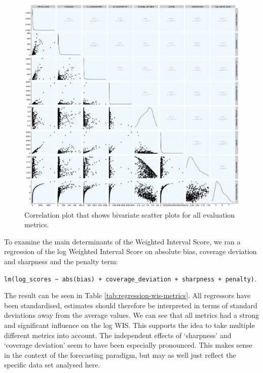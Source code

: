 \documentclass[
]{book}
\begin{document}
\begin{figure}

{\centering \includegraphics[width=1\linewidth]{../visualisation/chapter-5-results/scenario-baseline/corr-plot} 

}

\caption{Correlation plot that shows bivariate scatter plots for all evaluation metrics.}\label{fig:correlation-plot}
\end{figure}

To examine the main determinants of the Weighted Interval Score, we ran a regression of the log Weighted Interval Score on absolute bias, coverage deviation and sharpness and the penalty term:

\texttt{lm(log\_scores\ \textasciitilde{}\ abs(bias)\ +\ coverage\_deviation\ +\ sharpness\ +\ penalty)}.

The result can be seen in Table \ref{tab:regression-wis-metrics}. All regressors have been standardised, estimates should therefore be interpreted in terms of standard deviations away from the average values. We can see that all metrics had a strong and significant influence on the log WIS. This supports the idea to take multiple different metrics into account. The independent effects of `sharpness' and `coverage deviation' seem to have been especially pronounced. This makes sense in the context of the forecasting paradigm, but may as well just reflect the specific data set analysed here.
\end{document}
